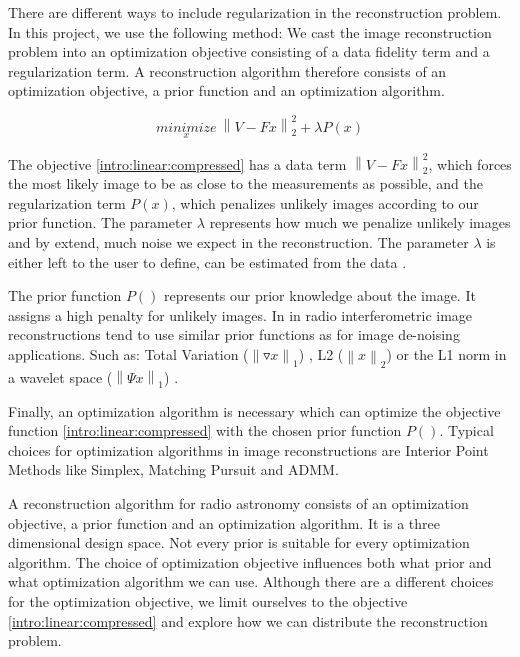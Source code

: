 There are different ways to include regularization in the reconstruction problem. In this project, we use the following method: We cast the image reconstruction problem into an optimization objective consisting of a data fidelity term and a regularization term. A reconstruction algorithm therefore consists of an optimization objective, a prior function and an optimization algorithm.

\begin{equation}\label{intro:linear:compressed}
\underset{x}{minimize} \: \left \| V - Fx \right \|_2^2 + \lambda P(x)
\end{equation}

The objective \eqref{intro:linear:compressed} has a data term $\left \| V - Fx \right \|_2^2$, which forces the most likely image to be as close to the measurements as possible, and the regularization term $P(x)$, which penalizes unlikely images according to our prior function. The parameter $\lambda$ represents how much we penalize unlikely images and by extend, much noise we expect in the reconstruction. The parameter $\lambda$ is either left to the user to define, can be estimated from the data \cite{miller1970least}. 

The prior function $P()$ represents our prior knowledge about the image. It assigns a high penalty for unlikely images. In in radio interferometric image reconstructions tend to use similar prior functions as for image de-noising applications. Such as: Total Variation ($\left \| \triangledown x \right \|_1$) \cite{wiaux2009compressed}, L2 ($\left \|x \right \|_2$) \cite{ferrari2014distributed} or the L1 norm in a wavelet space ($\left \|\Psi x \right \|_1$) \cite{girard2015sparse}.

Finally, an optimization algorithm is necessary which can optimize the objective function \eqref{intro:linear:compressed} with the chosen prior function $P()$. Typical choices for optimization algorithms in image reconstructions are Interior Point Methods like Simplex, Matching Pursuit \cite{hogbom1974aperture} and ADMM\cite{carrillo2014purify}. 

A reconstruction algorithm for radio astronomy consists of an optimization objective, a prior function and an optimization algorithm. It is a three dimensional design space. Not every prior is suitable for every optimization algorithm. The choice of optimization objective influences both what prior and what optimization algorithm we can use. Although there are a different choices for the optimization objective, we limit ourselves to the objective \eqref{intro:linear:compressed} and explore how we can distribute the reconstruction problem.

